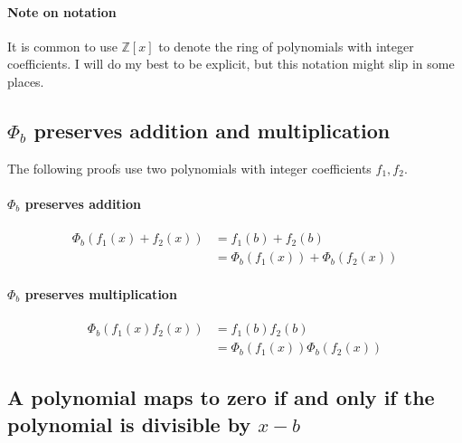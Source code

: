 \documentclass[12pt]{article}
\begin{document}
\paragraph*{Note on notation}
It is common to use $\mathbb{Z}[x]$ to denote the ring of polynomials with integer coefficients.  I will do my best to be explicit, but this notation might slip in some places. 


\subsection*{$\Phi_b$ preserves addition and multiplication}

The following proofs use two polynomials with integer coefficients $f_1, f_2$.
\paragraph*{$\Phi_b$ preserves addition}
\begin{align*}
\Phi_b(f_1(x)+f_2(x)) &= f_1(b) + f_2(b)\\
&= \Phi_b(f_1(x)) + \Phi_b(f_2(x))
\end{align*}

\paragraph{$\Phi_b$ preserves multiplication}
\begin{align*}
\Phi_b(f_1(x) f_2(x)) &=  f_1(b) f_2(b)\\
&= \Phi_b(f_1(x)) \Phi_b(f_2(x))
\end{align*}


\subsection*{A polynomial maps to zero if and only if the polynomial is divisible by $x-b$}
\end{document}
